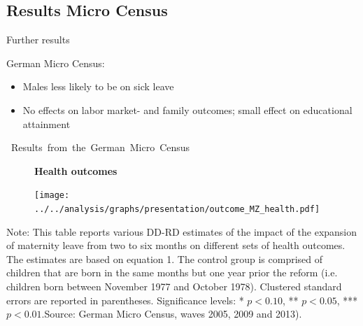 \documentclass[aspectratio=169,handout]{beamer} %
\begin{document}
\subsection*{Results Micro Census}
\label{MZ}

\begin{frame}{Further results}

\begin{block}{German Micro Census:}
\begin{itemize}
\item Males less likely to be on sick leave
\item No effects on labor market- and family outcomes; small effect on educational attainment
\end{itemize}
\end{block}
\hyperlink{CONCLUSION}{}
\end{frame}
\begin{frame}{\mbox{ Results from the German Micro Census}}
\begin{figure} \begin{center}
\textbf{Health outcomes}
\end{center} 
\texttt{[image: ../../analysis/graphs/presentation/outcome\_MZ\_health.pdf]}
\end{figure}\vspace{-2.5em}
\tiny \flushleft Note: This table reports various DD-RD estimates of the impact of the expansion of maternity leave from two to six months on different sets of health outcomes. The estimates are based on equation 1. The control group is comprised of children that are born in the same months but one year prior the reform (i.e. children born between  November 1977 and October 1978). Clustered standard errors are reported in parentheses. Significance levels: * \(p<0.10\), ** \(p<0.05\), *** \(p<0.01\).\newline Source: German Micro Census, waves 2005, 2009 and 2013). 
\hyperlink{CONCLUSION}{}
\end{frame}
\end{document}
